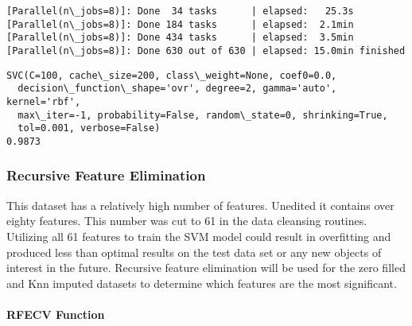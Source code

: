 \documentclass[11pt]{article}
\begin{document}
    \begin{Verbatim}[commandchars=\\\{\}]
[Parallel(n\_jobs=8)]: Done  34 tasks      | elapsed:   25.3s
[Parallel(n\_jobs=8)]: Done 184 tasks      | elapsed:  2.1min
[Parallel(n\_jobs=8)]: Done 434 tasks      | elapsed:  3.5min
[Parallel(n\_jobs=8)]: Done 630 out of 630 | elapsed: 15.0min finished

    \end{Verbatim}

    \begin{Verbatim}[commandchars=\\\{\}]
SVC(C=100, cache\_size=200, class\_weight=None, coef0=0.0,
  decision\_function\_shape='ovr', degree=2, gamma='auto', kernel='rbf',
  max\_iter=-1, probability=False, random\_state=0, shrinking=True,
  tol=0.001, verbose=False)
0.9873

    \end{Verbatim}

    \subsubsection{Recursive Feature
Elimination}\label{recursive-feature-elimination}

This dataset has a relatively high number of features. Unedited it
contains over eighty features. This number was cut to 61 in the data
cleansing routines. Utilizing all 61 features to train the SVM model
could result in overfitting and produced less than optimal results on
the test data set or any new objects of interest in the future.
Recursive feature elimination will be used for the zero filled and Knn
imputed datasets to determine which features are the most significant.

    \paragraph{RFECV Function}\label{rfecv-function}
\end{document}
